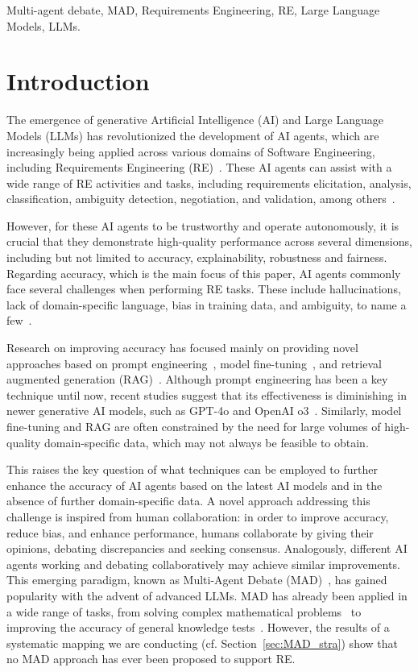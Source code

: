 \documentclass[conference]{IEEEtran}
\begin{document}
\begin{IEEEkeywords}
Multi-agent debate, MAD, Requirements Engineering, RE, Large Language Models, LLMs.
\end{IEEEkeywords}

\section{Introduction}
The emergence of generative Artificial Intelligence (AI) and Large Language Models (LLMs) has revolutionized the development of AI agents, which are increasingly being applied across various domains of Software Engineering, including Requirements Engineering (RE)~\cite{Lo2024}. These AI agents can assist with a wide range of RE activities and tasks, including requirements elicitation, analysis, classification, ambiguity detection, negotiation, and validation, among others~\cite{Arora2024}.

However, for these AI agents to be trustworthy and operate autonomously, it is crucial that they demonstrate high-quality performance across several dimensions, including but not limited to accuracy, explainability, robustness and fairness. Regarding accuracy, which is the main focus of this paper, AI agents commonly face several challenges when performing RE tasks. These include hallucinations, lack of domain-specific language, bias in training data, and ambiguity, to name a few~\cite{naveed2024}.

Research on improving accuracy has focused mainly on providing novel approaches based on prompt engineering~\cite{Ronanki2024}, model fine-tuning~\cite{Liu2024}, and retrieval augmented generation (RAG)~\cite{Arora2024b}.
Although prompt engineering has been a key technique until now, recent studies suggest that its effectiveness is diminishing in newer generative AI models, such as GPT-4o and OpenAI o3~\cite{wang2024}. Similarly, model fine-tuning and RAG are often constrained by the need for large volumes of high-quality domain-specific data, which may not always be feasible to obtain.

This raises the key question of what techniques can be employed to further enhance the accuracy of AI agents based on the latest AI models and in the absence of further domain-specific data. A novel approach addressing this challenge is inspired from human collaboration: in order to improve accuracy, reduce bias, and enhance performance, humans collaborate by giving their opinions, debating discrepancies and seeking consensus. Analogously, different AI agents working and debating collaboratively may achieve similar improvements. This emerging paradigm, known as Multi-Agent Debate (MAD)~\cite{p28-chan-2024, p04-liang-2024}, has gained popularity with the advent of advanced LLMs. MAD has already been applied in a wide range of tasks, from solving complex mathematical problems~\cite{p03-li-2024} to improving the accuracy of general knowledge tests~\cite{p17-wang-2025}. However, the results of a systematic mapping we are conducting (cf. Section~\ref{sec:MAD_stra}) show that no MAD approach has ever been proposed to support RE. 
\end{document}

